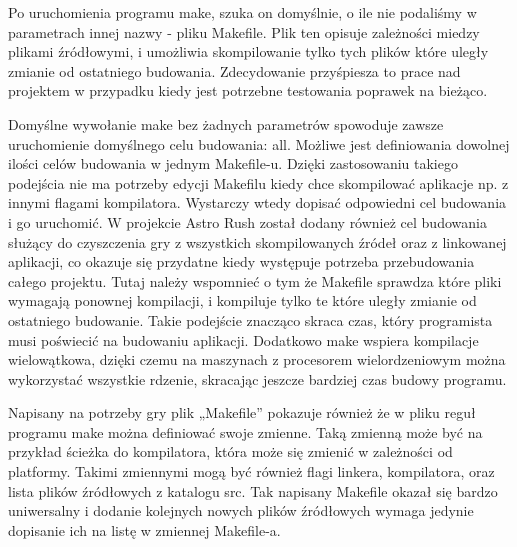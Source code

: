 Po uruchomienia programu make, szuka on domyślnie, o ile nie podaliśmy w parametrach innej nazwy - pliku Makefile. Plik ten opisuje zależności miedzy plikami źródłowymi, i umożliwia skompilowanie tylko tych plików które uległy zmianie od ostatniego budowania. Zdecydowanie przyśpiesza to prace nad projektem w przypadku kiedy jest potrzebne testowania poprawek na bieżąco. 

Domyślne wywołanie make bez żadnych parametrów spowoduje zawsze uruchomienie domyślnego celu budowania: all. Możliwe jest definiowania dowolnej ilości celów budowania w jednym Makefile-u. Dzięki zastosowaniu takiego podejścia nie ma potrzeby edycji Makefilu kiedy chce skompilować aplikacje np. z innymi flagami kompilatora. Wystarczy wtedy dopisać odpowiedni cel budowania i go uruchomić. W projekcie Astro Rush został dodany również cel budowania służący do czyszczenia gry z wszystkich skompilowanych źródeł oraz z linkowanej aplikacji, co okazuje się przydatne kiedy występuje potrzeba przebudowania całego projektu. Tutaj należy wspomnieć o tym że Makefile sprawdza które pliki wymagają ponownej kompilacji, i kompiluje tylko te które uległy zmianie od ostatniego budowanie. Takie podejście znacząco skraca czas, który programista musi poświecić na budowaniu aplikacji. Dodatkowo make wspiera kompilacje wielowątkowa, dzięki czemu na maszynach z procesorem wielordzeniowym można wykorzystać wszystkie rdzenie, skracając jeszcze bardziej czas budowy programu. 

Napisany na potrzeby gry plik „Makefile” pokazuje również że w pliku reguł programu make można definiować swoje zmienne. Taką zmienną może być na przykład ścieżka do kompilatora, która może się zmienić w zależności od platformy. Takimi zmiennymi mogą być również flagi linkera, kompilatora, oraz lista plików źródłowych z katalogu src. Tak napisany Makefile okazał się bardzo uniwersalny i dodanie kolejnych nowych plików źródłowych wymaga jedynie dopisanie ich na listę w zmiennej Makefile-a. 

